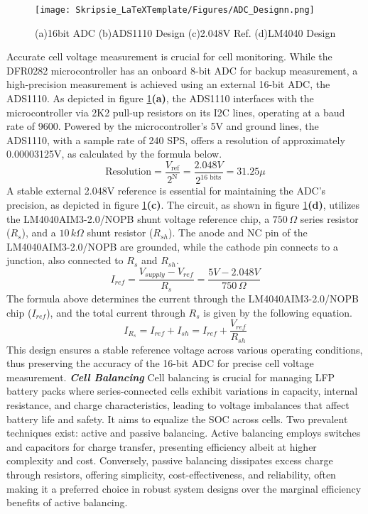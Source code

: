 \begin{figure}[h!]
\centering
\texttt{[image: Skripsie\_LaTeXTemplate/Figures/ADC\_Designn.png]}
\caption{(a)16bit ADC (b)ADS1110 Design\cite{TheADC} (c)2.048V Ref. (d)LM4040 Design\cite{PrecRef}}
\label{fig:MM_D1}
\end{figure}
\noindent
Accurate cell voltage measurement is crucial for cell monitoring. While the DFR0282 microcontroller has an onboard 8-bit ADC for backup measurement, a high-precision measurement is achieved using an external 16-bit ADC, the ADS1110. As depicted in figure \ref{fig:MM_D1}\textbf{(a)}, the ADS1110 interfaces with the microcontroller via 2K2 pull-up resistors on its I2C lines, operating at a baud rate of 9600. Powered by the microcontroller's 5V and ground lines, the ADS1110, with a sample rate of 240 SPS, offers a resolution of approximately 0.00003125V, as calculated by the formula below.
\[
\text{Resolution} = \frac{V_{\text{ref}}}{2^{\text{N}}} = \frac{2.048V}{2^{\text{16 bits}}} = 31.25 \mu
\]
\noindent
A stable external 2.048V reference is essential for maintaining the ADC's precision, as depicted in figure \ref{fig:MM_D1}\textbf{(c)}. The circuit, as shown in figure \ref{fig:MM_D1}\textbf{(d)}, utilizes the LM4040AIM3-2.0/NOPB shunt voltage reference chip, a \(750 \, \Omega\) series resistor (\(R_s\)), and a \(10 \, k\Omega\) shunt resistor (\(R_{sh}\)). The anode and NC pin of the LM4040AIM3-2.0/NOPB are grounded, while the cathode pin connects to a junction, also connected to \(R_s\) and \(R_{sh}\).
\[
I_{ref} = \frac{V_{supply} - V_{ref}}{R_s} = \frac{5V - 2.048V}{750 \, \Omega}
\]
\noindent
The formula above determines the current through the LM4040AIM3-2.0/NOPB chip (\(I_{ref}\)), and the total current through \(R_s\) is given by the following equation.
\[
I_{R_s} = I_{ref} + I_{sh} = I_{ref} + \frac{V_{ref}}{R_{sh}}
\]
\noindent
This design ensures a stable reference voltage across various operating conditions, thus preserving the accuracy of the 16-bit ADC for precise cell voltage measurement.\newline\newline
\noindent
\textbf{\emph{Cell Balancing}}\label{subsubsec:DL_Designn}\newline
\noindent
Cell balancing is crucial for managing LFP battery packs where series-connected cells exhibit variations in capacity, internal resistance, and charge characteristics, leading to voltage imbalances that affect battery life and safety. It aims to equalize the SOC across cells. Two prevalent techniques exist: active and passive balancing. Active balancing employs switches and capacitors for charge transfer, presenting efficiency albeit at higher complexity and cost. Conversely, passive balancing dissipates excess charge through resistors, offering simplicity, cost-effectiveness, and reliability, often making it a preferred choice in robust system designs over the marginal efficiency benefits of active balancing.

